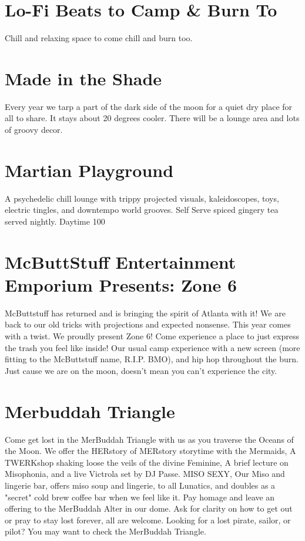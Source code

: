 \section*{Lo-Fi Beats to Camp \& Burn To}
Chill and relaxing space to come chill and burn too. 


\section*{Made in the Shade}
Every year we tarp a part of the dark side of the moon for a quiet dry place for all to share. It stays about 20 degrees cooler. There will be a lounge area and lots of groovy decor. 


\section*{Martian Playground}
A psychedelic chill lounge with trippy projected visuals, kaleidoscopes, toys, electric tingles, and downtempo world grooves. Self Serve spiced gingery tea served nightly. Daytime 100%


\section*{McButtStuff Entertainment Emporium Presents: Zone 6}
McButtstuff has returned and is bringing the spirit of Atlanta with it! We are back to our old tricks with projections and expected nonsense. This year comes with a twist. We proudly present Zone 6! Come experience a place to just express the trash you feel like inside! Our usual camp experience with a new screen (more fitting to the McButtstuff name, R.I.P. BMO), and hip hop throughout the burn. Just cause we are on the moon, doesn't mean you can't experience the city. 


\section*{Merbuddah Triangle}
Come get lost in the MerBuddah Triangle with us as you traverse the Oceans of the Moon. We offer the HERstory of MERstory storytime with the Mermaids, A TWERKshop shaking loose the veils of the divine Feminine, A brief lecture on Misophonia, and a live Victrola set by DJ Passe. MISO SEXY, Our Miso and lingerie bar, offers miso soup and lingerie, to all Lunatics, and doubles as a "secret" cold brew coffee bar when we feel like it. Pay homage and leave an offering to the MerBuddah Alter in our dome. Ask for clarity on how to get out or pray to stay lost forever, all are welcome. Looking for a lost pirate, sailor, or pilot? You may want to check the MerBuddah Triangle. 


